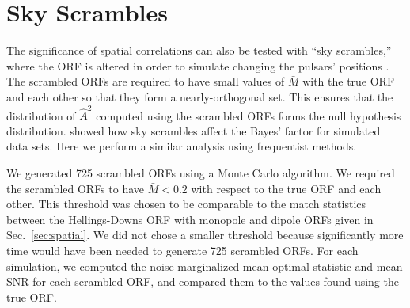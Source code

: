 \documentclass[twocolumn,aps,prd,superscriptaddress]{revtex4-1}
\begin{document}
\section{Sky Scrambles}
\label{sec:skyscrambles}

The significance of spatial correlations can also be tested with ``sky scrambles,'' 
where the ORF is altered in order to simulate changing the pulsars' positions \citep{cs2016,tlb+2017}. 
The scrambled ORFs are required to have small values of $\bar{M}$ 
with the true ORF and each other so that they form a nearly-orthogonal set. 
This ensures that the distribution of $\hat{A}^2$ computed using the scrambled ORFs 
forms the null hypothesis distribution. 
\citet{tlb+2017} showed how sky scrambles affect the Bayes' factor for simulated data sets. 
Here we perform a similar analysis using frequentist methods.

We generated 725 scrambled ORFs 
using a Monte Carlo algorithm. 
We required the scrambled ORFs to have $\bar{M} < 0.2$ 
with respect to the true ORF and each other. 
This threshold was chosen to be comparable to the match statistics 
between the Hellings-Downs ORF with monopole and dipole ORFs 
given in Sec.~\ref{sec:spatial}. 
We did not chose a smaller threshold because significantly more time 
would have been needed to generate 725 scrambled ORFs. 
For each simulation, we computed the 
noise-marginalized mean optimal statistic and mean SNR 
for each scrambled ORF, 
and compared them to the values found using the true ORF.
\end{document}
